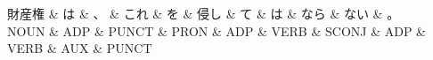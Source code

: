 \documentclass[tikz,border=5pt]{standalone}
\begin{document}
\normalsize
\begin{dependency}[edge unit distance=12.0pt]
    \begin{deptext}[column sep=1em]
        財産権 \& は \& 、 \& これ \& を \& 侵し \& て \& は \& なら \& ない \& 。\\
        NOUN \& ADP \& PUNCT \& PRON \& ADP \& VERB \& SCONJ \& ADP \& VERB \& AUX \& PUNCT\\
    \end{deptext}
\end{dependency}
\end{document}
